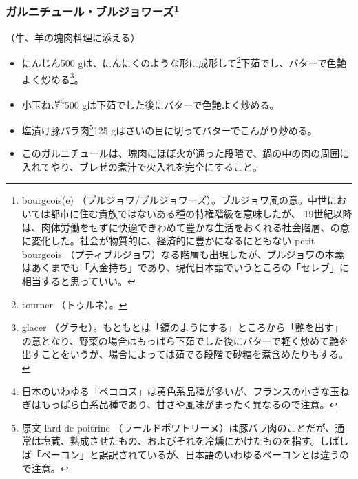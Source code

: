 \begin{recette}
\atoaki{}

\hypertarget{garniture-bourgeoise}{%
\subsubsection[ガルニチュール・ブルジョワーズ]{\texorpdfstring{ガルニチュール・ブルジョワーズ\footnote{bourgeois(e)
  （ブルジョワ/ブルジョワーズ）。ブルジョワ風の意。中世においては都市に住む貴族ではないある種の特権階級を意味したが、
  19世紀以降は、肉体労働をせずに快適できわめて豊かな生活をおくれる社会階層、の意に変化した。社会が物質的に、経済的に豊かになるにともない
  petit bourgeois
  （プティブルジョワ）なる階層も出現したが、ブルジョワの本義はあくまでも「大金持ち」であり、現代日本語でいうところの「セレブ」に相当すると思っていい。}}{ガルニチュール・ブルジョワーズ}}\label{garniture-bourgeoise}}



（牛、羊の塊肉料理に添える）

\begin{itemize}
\item
  にんじん500 gは、にんにくのような形に成形して\footnote{tourner
    （トゥルネ）。}下茹でし、バターで色艶よく炒める\footnote{glacer
    （グラセ）。もともとは「鏡のようにする」ところから「艶を出す」の意となり、野菜の場合はもっぱら下茹でした後にバターで軽く炒めて艶を出すことをいうが、場合によっては茹でる段階で砂糖を煮含めたりもする。}。
\item
  小玉ねぎ\footnote{日本のいわゆる「ペコロス」は黄色系品種が多いが、フランスの小さな玉ねぎはもっぱら白系品種であり、甘さや風味がまったく異なるので注意。}500
  gは下茹でした後にバターで色艶よく炒める。
\item
  塩漬け豚バラ肉\footnote{原文 lard de poitrine
    （ラールドポワトリーヌ）は豚バラ肉のことだが、通常は塩蔵、熟成させたもの、およびそれを冷燻にかけたものを指す。しばしば「ベーコン」と誤訳されているが、日本語のいわゆるベーコンとは違うので注意。}125
  gはさいの目に切ってバターでこんがり炒める。
\item
  このガルニチュールは、塊肉にほぼ火が通った段階で、鍋の中の肉の周囲に入れてやり、ブレゼの煮汁で火入れを完全にすること。
\end{itemize}


\end{recette}
